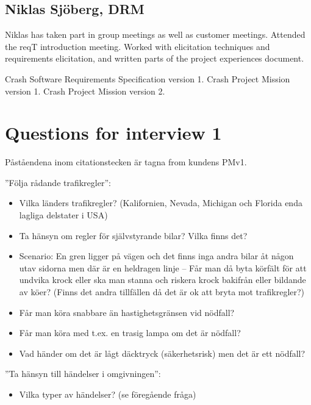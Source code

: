\documentclass[10pt]{article}
\begin{document}
\subsection{Niklas Sjöberg, DRM}
Niklas has taken part in group meetings as well as customer meetings. Attended the reqT introduction meeting. Worked with elicitation techniques and requirements elicitation, and written parts of the project experiences document. 

\newpage
\begin{thebibliography}{1}
 Crash Software Requirements Specification version 1. 
 Crash Project Mission version 1.
 Crash Project Mission version 2.
\end{thebibliography}
\newpage

\appendix
\section{Questions for interview 1}
Påståendena inom citationstecken är tagna from kundens PMv1.

\noindent”Följa rådande trafikregler”:
\begin{itemize}
\item Vilka länders trafikregler? (Kalifornien, Nevada, Michigan och Florida enda lagliga delstater i USA)
\item Ta hänsyn om regler för självstyrande bilar? Vilka finns det?
\item Scenario: En gren ligger på vägen och det finns inga andra bilar åt någon utav sidorna men där är en heldragen linje – Får man då byta körfält för att undvika krock eller ska man stanna och riskera krock bakifrån eller bildande av köer? (Finns det andra tillfällen då det är ok att bryta mot trafikregler?)
\item Får man köra snabbare än hastighetsgränsen vid nödfall?
\item Får man köra med t.ex. en trasig lampa om det är nödfall?
\item Vad händer om det är lågt däcktryck (säkerhetsrisk) men det är ett nödfall?
\end{itemize}
\hfill \break

\noindent ”Ta hänsyn till händelser i omgivningen”:
\begin{itemize}
\item Vilka typer av händelser? (se föregående fråga)
\end{itemize}
\hfill \break
\end{document}

